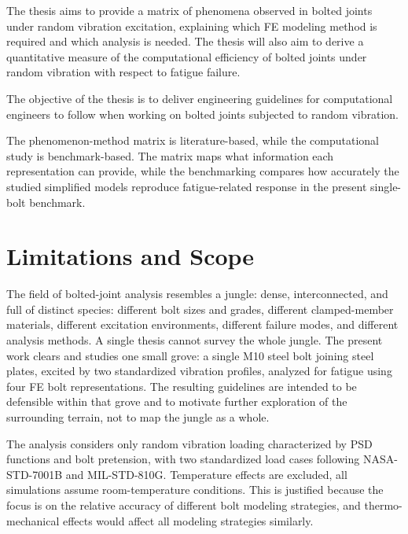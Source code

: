 \documentclass[a4paper,twoside]{bth}
\begin{document}
The thesis aims to provide a matrix of phenomena observed in bolted joints under random vibration excitation, explaining which \ac{FE} modeling method is required and which analysis is needed. The thesis will also aim to derive a quantitative measure of the computational efficiency of bolted joints under random vibration with respect to fatigue failure. 

The objective of the thesis is to deliver engineering guidelines for computational engineers to follow when working on bolted joints subjected to random vibration.

The phenomenon-method matrix is literature-based, while the computational study is benchmark-based. The matrix maps what information each representation can provide, while the benchmarking compares how accurately the studied simplified models reproduce fatigue-related response in the present single-bolt benchmark.

\section{Limitations and Scope} \label{sec:limitations}

The field of bolted-joint analysis resembles a jungle: dense, interconnected, and full of distinct species: different bolt sizes and grades, different clamped-member materials, different excitation environments, different failure modes, and different analysis methods. A single thesis cannot survey the whole jungle. The present work clears and studies one small grove: a single M10 steel bolt joining steel plates, excited by two standardized vibration profiles, analyzed for fatigue using four \ac{FE} bolt representations. The resulting guidelines are intended to be defensible within that grove and to motivate further exploration of the surrounding terrain, not to map the jungle as a whole.

The analysis considers only random vibration loading characterized by \ac{PSD} functions and bolt pretension, with two standardized load cases following NASA-STD-7001B and MIL-STD-810G. Temperature effects are excluded, all simulations assume room-temperature conditions. This is justified because the focus is on the relative accuracy of different bolt modeling strategies, and thermo-mechanical effects would affect all modeling strategies similarly.
\end{document}
